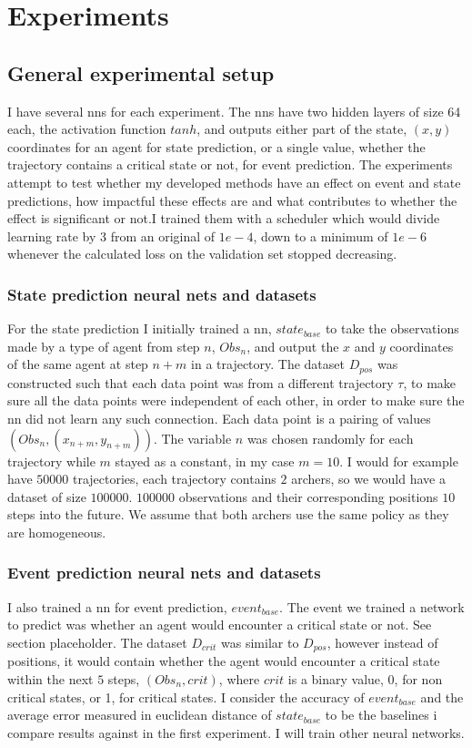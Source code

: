 \documentclass[UKenglish]{uiomasterthesis}
\begin{document}
\chapter{Experiments}
\section{General experimental setup}
I have several \acp{nn} for each experiment. The \acp{nn} have two hidden layers of size 64 each, the activation function $tanh$, and outputs either part of the state, $(x,y)$ coordinates for an agent for state prediction, or a single value, whether the trajectory contains a critical state or not, for event prediction. The experiments attempt to test whether my developed methods have an effect on event and state predictions, how impactful these effects are and what contributes to whether the effect is significant or not.I trained them with a scheduler which would divide learning rate by $3$ from an original of $1e-4$, down to a minimum of $1e-6$ whenever the calculated loss on the validation set stopped decreasing.
\subsection{State prediction neural nets and datasets}
For the state prediction I initially trained a \ac{nn}, $state_{base}$ to take the observations made by a type of agent from step $n$, $Obs_n$, and output the $x$ and $y$ coordinates of the same agent at step $n+m$ in a trajectory. The dataset $D_{pos}$ was constructed such that each data point was from a different trajectory $\tau$, to make sure all the data points were independent of each other, in order to make sure the \ac{nn} did not learn any such connection. Each data point is a pairing of values $(Obs_n, (x_{n+m},y_{n+m}))$. The variable $n$ was chosen randomly for each trajectory while $m$ stayed as a constant, in my case $m=10$. I would for example have $50000$ trajectories, each trajectory contains $2$ archers, so we would have a dataset of size $100000$. $100000$ observations and their corresponding positions $10$ steps into the future. We assume that both archers use the same policy as they are homogeneous.

\subsection{Event prediction neural nets and datasets}
I also trained a \ac{nn} for event prediction, $event_{base}$. The event we trained a network to predict was whether an agent would encounter a critical state or not. See section placeholder. The dataset $D_{crit}$ was similar to $D_{pos}$, however instead of positions, it would contain whether the agent would encounter a critical state within the next $5$ steps, $(Obs_n, crit)$, where $crit$ is a binary value, 0, for non critical states, or 1, for critical states.
I consider the accuracy of $event_{base}$ and the average error measured in euclidean distance of $state_{base}$ to be the baselines i compare results against in the first experiment. I will train other neural networks.
\end{document}
